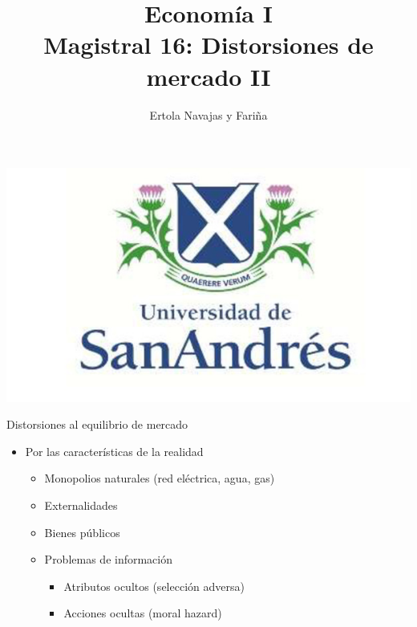 \documentclass{beamer}
\title[Economía I]{Economía I \vspace{4mm}
\\ Magistral 16: Distorsiones de mercado II}
\date{}
\author[Ertola Navajas y Fariña]{Ertola Navajas y Fariña}
\institute[]{Universidad de San Andrés}
\begin{document}
\begin{frame}
\titlepage
\centering
\includegraphics[scale=0.2]{Slides Principios de Economia/Figures/logoUDESA.jpg} 
\end{frame}


\begin{frame}{Distorsiones al equilibrio de mercado}
    \begin{itemize}
        \item Por las características de la realidad \vspace{1mm}
        \begin{itemize}
            \item Monopolios naturales (red eléctrica, agua, gas)   
             \vspace{1mm}
            \item Externalidades
             \vspace{1mm}
            \item Bienes públicos
            \vspace{1mm}
            \item Problemas de información
            \begin{itemize}
                \item Atributos ocultos (selección adversa)
                 \vspace{1mm}
                \item Acciones ocultas (moral hazard)
            \end{itemize}        
        \end{itemize}
    \end{itemize}
\end{frame}
\end{document}
